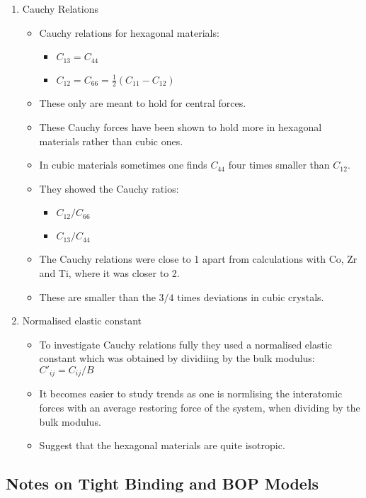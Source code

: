 \documentclass[11pt]{article}
\begin{document}
\begin{enumerate}
\item Cauchy Relations
\label{sec-2-5-2-1}
\begin{itemize}
\item Cauchy relations for hexagonal materials:
\begin{itemize}
\item $C_{13} = C_{44}$
\item $C_{12} = C_{66} = \frac{1}{2}(C_{11} - C_{12})$
\end{itemize}
\item These only are meant to hold for central forces.
\item These Cauchy forces have been shown to hold more in hexagonal materials
rather than cubic ones.
\item In cubic materials sometimes one finds $C_{44}$ four times smaller than
$C_{12}$.
\item They showed the Cauchy ratios:
\begin{itemize}
\item $C_{12}/C_{66}$
\item $C_{13}/C_{44}$
\end{itemize}
\item The Cauchy relations were close to 1 apart from calculations with Co, Zr and
Ti, where it was closer to 2.
\item These are smaller than the $3/4$ times deviations in cubic crystals.
\end{itemize}

\item Normalised elastic constant
\label{sec-2-5-2-2}
\begin{itemize}
\item To investigate Cauchy relations fully they used a normalised elastic constant which
was obtained by dividiing by the bulk modulus: $C'_{ij} = C_{ij}/B$
\item It becomes easier to study trends as one is normlising the
interatomic forces with an average restoring force of the system,
when dividing by the bulk modulus.
\item Suggest that the hexagonal materials are quite isotropic.
\end{itemize}
\end{enumerate}
\subsection{Notes on Tight Binding and BOP Models}
\label{sec-2-6}
\end{document}
